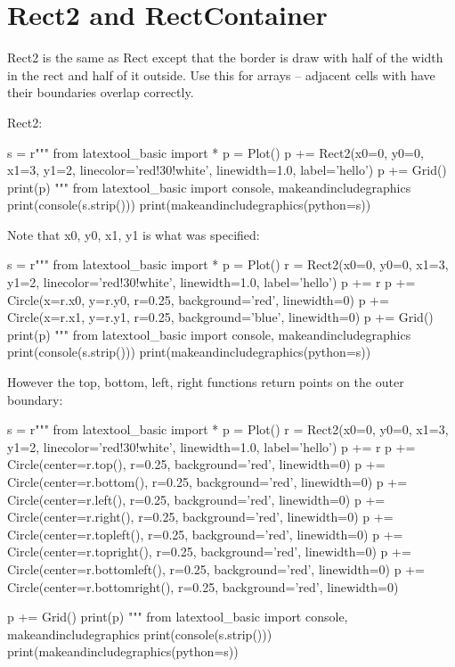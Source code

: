 \section{Rect2 and RectContainer}

Rect2 is the same as Rect except that the border is draw with half of the width
in the rect and half of it outside.
Use this for arrays -- adjacent cells with have their boundaries overlap
correctly.

Rect2:
\begin{python}
s = r"""
from latextool_basic import *
p = Plot()
p += Rect2(x0=0, y0=0, x1=3, y1=2, linecolor='red!30!white',
           linewidth=1.0, label='hello')
p += Grid()
print(p)
"""
from latextool_basic import console, makeandincludegraphics
print(console(s.strip()))
print(makeandincludegraphics(python=s))
\end{python}






\begin{samepage}
Note that x0, y0, x1, y1 is what was specified:
\begin{python}
s = r"""
from latextool_basic import *
p = Plot()
r = Rect2(x0=0, y0=0, x1=3, y1=2, linecolor='red!30!white',
           linewidth=1.0, label='hello')
p += r
p += Circle(x=r.x0, y=r.y0, r=0.25, background='red', linewidth=0)
p += Circle(x=r.x1, y=r.y1, r=0.25, background='blue', linewidth=0)
p += Grid()
print(p)
"""
from latextool_basic import console, makeandincludegraphics
print(console(s.strip()))
print(makeandincludegraphics(python=s))
\end{python}
\end{samepage}





\begin{samepage}
However the top, bottom, left, right functions return
points on the outer boundary:
\begin{python}
s = r"""
from latextool_basic import *
p = Plot()
r = Rect2(x0=0, y0=0, x1=3, y1=2, linecolor='red!30!white',
           linewidth=1.0, label='hello')
p += r
p += Circle(center=r.top(), r=0.25, background='red', linewidth=0)
p += Circle(center=r.bottom(), r=0.25, background='red', linewidth=0)
p += Circle(center=r.left(), r=0.25, background='red', linewidth=0)
p += Circle(center=r.right(), r=0.25, background='red', linewidth=0)
p += Circle(center=r.topleft(), r=0.25, background='red', linewidth=0)
p += Circle(center=r.topright(), r=0.25, background='red', linewidth=0)
p += Circle(center=r.bottomleft(), r=0.25, background='red', linewidth=0)
p += Circle(center=r.bottomright(), r=0.25, background='red', linewidth=0)

p += Grid()
print(p)
"""
from latextool_basic import console, makeandincludegraphics
print(console(s.strip()))
print(makeandincludegraphics(python=s))
\end{python}
\end{samepage}


